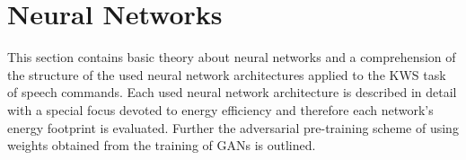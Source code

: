 
\chapter{Neural Networks}\label{sec:nn}
This section contains basic theory about neural networks and a comprehension of the structure of the used neural network architectures applied to the KWS task of speech commands.
Each used neural network architecture is described in detail with a special focus devoted to energy efficiency and therefore each network's energy footprint is evaluated.
Further the adversarial pre-training scheme of using weights obtained from the training of GANs is outlined.





